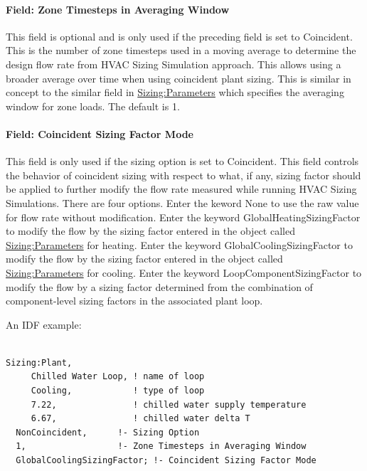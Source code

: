 \paragraph{Field: Zone Timesteps in Averaging Window}\label{field-zone-timesteps-in-averaging-window}

This field is optional and is only used if the preceding field is set to Coincident. This is the number of zone timesteps used in a moving average to determine the design flow rate from HVAC Sizing Simulation approach. This allows using a broader average over time when using coincident plant sizing. This is similar in concept to the similar field in \hyperref[sizingparameters]{Sizing:Parameters} which specifies the averaging window for zone loads. The default is 1.

\paragraph{Field: Coincident Sizing Factor Mode}\label{field-coincident-sizing-factor-mode}

This field is only used if the sizing option is set to Coincident. This field controls the behavior of coincident sizing with respect to what, if any, sizing factor should be applied to further modify the flow rate measured while running HVAC Sizing Simulations. There are four options. Enter the keword None to use the raw value for flow rate without modification. Enter the keyword GlobalHeatingSizingFactor to modify the flow by the sizing factor entered in the object called \hyperref[sizingparameters]{Sizing:Parameters} for heating. Enter the keyword GlobalCoolingSizingFactor to modify the flow by the sizing factor entered in the object called \hyperref[sizingparameters]{Sizing:Parameters} for cooling. Enter the keyword LoopComponentSizingFactor to modify the flow by a sizing factor determined from the combination of component-level sizing factors in the associated plant loop.

An IDF example:

\begin{lstlisting}

Sizing:Plant,
     Chilled Water Loop, ! name of loop
     Cooling,            ! type of loop
     7.22,               ! chilled water supply temperature
     6.67,               ! chilled water delta T
  NonCoincident,      !- Sizing Option
  1,                  !- Zone Timesteps in Averaging Window
  GlobalCoolingSizingFactor; !- Coincident Sizing Factor Mode
\end{lstlisting}

